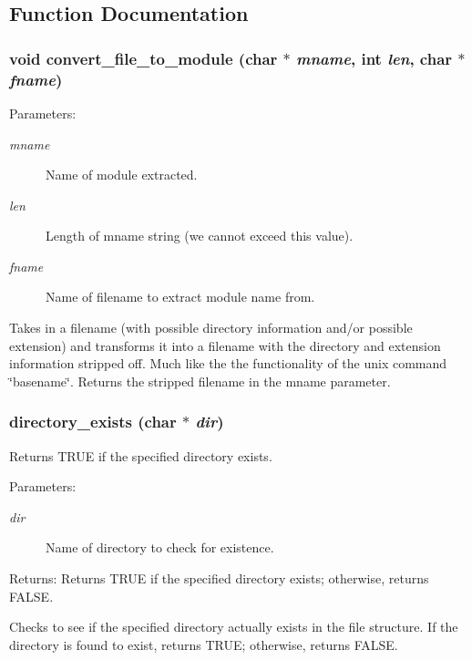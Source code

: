 \subsection{Function Documentation}
\subsubsection{\setlength{\rightskip}{0pt plus 5cm}void convert\_\-file\_\-to\_\-module (char $\ast$ {\em mname}, int {\em len}, char $\ast$ {\em fname})}\label{util_8c_a18}


\begin{Desc}
\item[Parameters:]
\begin{description}
\item[{\em mname}]Name of module extracted. \item[{\em len}]Length of mname string (we cannot exceed this value). \item[{\em fname}]Name of filename to extract module name from.\end{description}
\end{Desc}
Takes in a filename (with possible directory information and/or possible extension) and transforms it into a filename with the directory and extension information stripped off. Much like the the functionality of the unix command \char`\"{}basename\char`\"{}. Returns the stripped filename in the mname parameter. 
\subsubsection{ directory\_\-exists (char $\ast$ {\em dir})}\label{util_8c_a10}


Returns TRUE if the specified directory exists.

\begin{Desc}
\item[Parameters:]
\begin{description}
\item[{\em dir}]Name of directory to check for existence. \end{description}
\end{Desc}
\begin{Desc}
\item[Returns:]Returns TRUE if the specified directory exists; otherwise, returns FALSE.\end{Desc}
Checks to see if the specified directory actually exists in the file structure. If the directory is found to exist, returns TRUE; otherwise, returns FALSE. 

